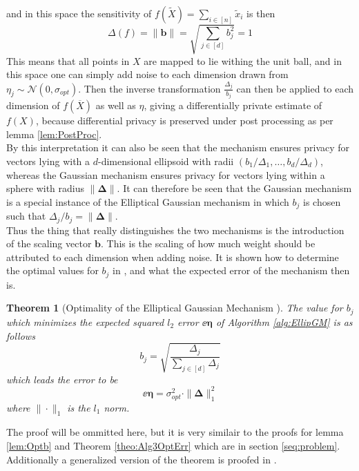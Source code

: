 \documentclass[a4paper,12pt]{article}
\newtheorem{theorem}{Theorem}
\begin{document}
and in this space the sensitivity of $f(\tilde{X})= \sum_{i \in [n]} \tilde{x}_i$ is then
\[
    \Delta(f) = \|\bm{b}\| = \sqrt{\sum_{j \in [d]} b_j^2} =  1
\]
This means that all points in $X$ are mapped to lie withing the unit ball, and in this space one can simply add noise to each 
dimension drawn from $\eta_j \sim \mathcal{N}(0, \sigma_{opt})$. Then the inverse transformation $\frac{\Delta_j}{b_j}$ 
can then be applied to each dimension of $f(\overline{X})$ as well as $\eta$, giving a differentially private estimate of $f(X)$, 
because differential privacy is preserved under post processing as per lemma \ref{lem:PostProc}. \\


By this interpretation it can also be seen that the mechanism ensures privacy for vectors lying with a $d$-dimensional
ellipsoid with radii $(b_1/\Delta_1, \dots, b_d/\Delta_d)$, 
whereas the Gaussian mechanism ensures privacy for vectors lying within a sphere with radius $\| \bm{\Delta} \|$.
It can therefore be seen that the Gaussian mechanism is a special instance of the Elliptical Gaussian mechanism
in which $b_j$ is chosen such that $\Delta_j/b_j = \| \bm{\Delta} \|$. \\
Thus the thing that really distinguishes the two mechanisms is the introduction of the scaling vector $\bm{b}$.
This is the scaling of how much weight should be attributed to each dimension when adding noise. It is shown how to determine the optimal values for $b_j$
in \cite{Lebeda2022}, and what the expected error of the mechanism then is.

\begin{theorem}[Optimality of the Elliptical Gaussian Mechanism ]
The value for $b_j$ which minimizes the expected squared $l_2$ error $\ee{\bm{\eta}}$ of Algorithm \ref{alg:EllipGM} is as follows
\[
    b_j = \sqrt{\frac{\Delta_j}{\sum_{j \in [d]} \Delta_j}}
\]
which leads the error to be
\begin{equation}
\label{eq:EGMErr}
    \ee{\bm{\eta}} =  \sigma_{opt}^2 \cdot \| \bm{\Delta} \|_1^2
\end{equation}
where $\| \cdot \|_1$ is the $l_1$ norm.

\end{theorem}
The proof will be ommitted here, but it is very similair to the proofs for lemma \ref{lem:Optb} and Theorem \ref{theo:Alg3OptErr} which are in section \ref{seq:problem}.
Additionally a generalized version of the theorem is proofed in \cite{Lebeda2022}.
\end{document}
